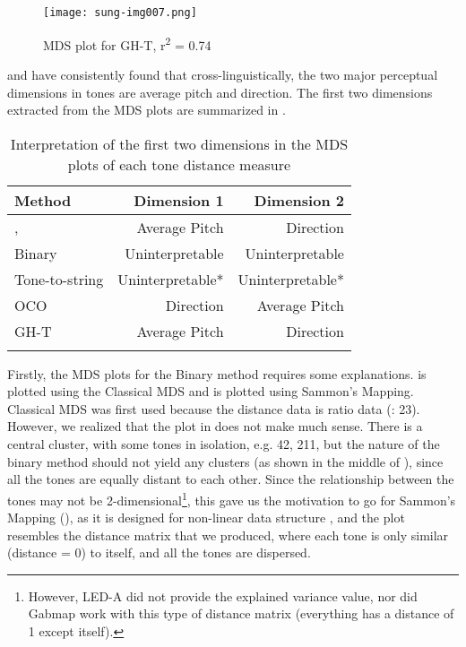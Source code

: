 \documentclass[output=paper, chinesefont]{langscibook}
\begin{document}
  
\begin{figure}
\texttt{[image: sung-img007.png]}
\caption{MDS plot for GH-T, r\textsuperscript{2} = 0.74}
\label{fig:sung:7}
\end{figure}

\citet{GandourHarshman1978} and \citet{Gandour1983} have consistently found that cross-linguistically, the two major perceptual dimensions in tones are average pitch and direction. The first two dimensions extracted from the MDS plots are summarized in .

\vfill
\begin{table}[H]
\begin{tabularx}{\textwidth}{Xrr}
\lsptoprule
{Method} & {Dimension 1} & {Dimension 2}\\\midrule
\citet{GandourHarshman1978}, \citet{Gandour1983} & Average Pitch & Direction\\
Binary & Uninterpretable & Uninterpretable\\
Tone-to-string & Uninterpretable* & Uninterpretable*\\
OCO & Direction & Average Pitch\\
GH-T & Average Pitch & Direction\\
\lspbottomrule
\end{tabularx}
\caption{Interpretation of the first two dimensions in the MDS plots of each tone distance measure}
\label{tab:sung:8}
\end{table}
\vfill\pagebreak

Firstly, the MDS plots for the Binary method requires some explanations.  is plotted using the Classical MDS and  is plotted using Sammon’s Mapping. Classical MDS was first used because the distance data is ratio data (\citealt{BorgGroenen2005}: 23). However, we realized that the plot in  does not make much sense. There is a central cluster, with some tones in isolation, e.g. 42, 211, but the nature of the binary method should not yield any clusters (as shown in the middle of ), since all the tones are equally distant to each other. Since the relationship between the tones may not be 2-dimensional\footnote{However, LED-A did not provide the explained variance value, nor did Gabmap work with this type of distance matrix (everything has a distance of 1 except itself).}, this gave us the motivation to go for Sammon’s Mapping (), as it is designed for non-linear data structure \citep{Sammon1969}, and the plot resembles the distance matrix that we produced, where each tone is only similar (distance = 0) to itself, and all the tones are dispersed.
\end{document}
